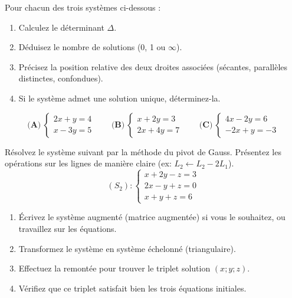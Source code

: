 \documentclass[11pt]{article}
\begin{document}
\begin{exercice}
Pour chacun des trois systèmes ci-dessous :
\begin{enumerate}
\item Calculez le déterminant $\Delta$.
\item Déduisez le nombre de solutions (0, 1 ou $\infty$).
\item Précisez la position relative des deux droites associées (sécantes, parallèles distinctes, confondues).
\item Si le système admet une solution unique, déterminez-la.
\end{enumerate}
\[
\textbf{(A)}\ \begin{cases} 2x + y = 4 \\ x - 3y = 5 \end{cases}
\qquad
\textbf{(B)}\ \begin{cases} x + 2y = 3 \\ 2x + 4y = 7 \end{cases}
\qquad
\textbf{(C)}\ \begin{cases} 4x - 2y = 6 \\ -2x + y = -3 \end{cases}
\]
\end{exercice}

\begin{exercice}
Résolvez le système suivant par la méthode du pivot de Gauss. Présentez les opérations sur les lignes de manière claire (ex: $L_2 \leftarrow L_2 - 2L_1$).
\[
(S_2) : \begin{cases}
x + 2y - z = 3 \\
2x - y + z = 0 \\
x + y + z = 6
\end{cases}
\]
\begin{enumerate}
\item Écrivez le système augmenté (matrice augmentée) si vous le souhaitez, ou travaillez sur les équations.
\item Transformez le système en système échelonné (triangulaire).
\item Effectuez la remontée pour trouver le triplet solution $(x;y;z)$.
\item Vérifiez que ce triplet satisfait bien les trois équations initiales.
\end{enumerate}
\end{exercice}
\end{document}
